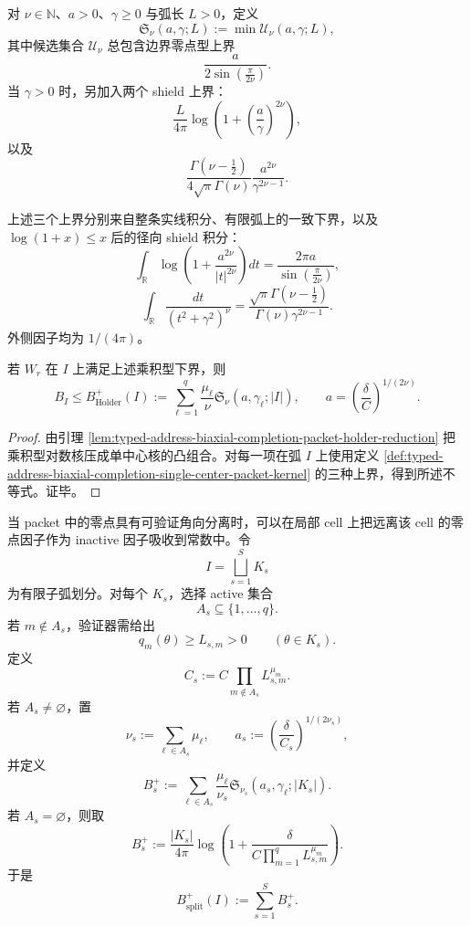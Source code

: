 \begin{definition}[单中心积分核]\label{def:typed-address-biaxial-completion-single-center-packet-kernel}
对 \(\nu\in\mathbb{N}\)、\(a>0\)、\(\gamma\ge0\) 与弧长 \(L>0\)，定义
\[
\mathfrak S_\nu(a,\gamma;L)
:=
\min\mathcal U_\nu(a,\gamma;L),
\]
其中候选集合 \(\mathcal U_\nu\) 总包含边界零点型上界
\[
\frac{a}{2\sin\left(\frac{\pi}{2\nu}\right)}.
\]
当 \(\gamma>0\) 时，另加入两个 shield 上界：
\[
\frac{L}{4\pi}
\log\left(1+\left(\frac{a}{\gamma}\right)^{2\nu}\right),
\]
以及
\[
\frac{\Gamma(\nu-\frac12)}
{4\sqrt{\pi}\Gamma(\nu)}
\frac{a^{2\nu}}{\gamma^{2\nu-1}}.
\]
\end{definition}

上述三个上界分别来自整条实线积分、有限弧上的一致下界，以及 \(\log(1+x)\le x\) 后的径向 shield 积分：
\[
\int_{\mathbb R}\log\left(1+\frac{a^{2\nu}}{|t|^{2\nu}}\right)dt
=
\frac{2\pi a}{\sin\left(\frac{\pi}{2\nu}\right)},
\]
\[
\int_{\mathbb R}\frac{dt}{(t^2+\gamma^2)^\nu}
=
\frac{\sqrt{\pi}\Gamma(\nu-\frac12)}
{\Gamma(\nu)\gamma^{2\nu-1}}.
\]
外侧因子均为 \(1/(4\pi)\)。

\begin{proposition}\label{prop:typed-address-biaxial-completion-unsplit-packet-bound}
若 \(W_r\) 在 \(I\) 上满足上述乘积型下界，则
\[
B_I
\le
B_{\mathrm{Holder}}^+(I)
:=
\sum_{\ell=1}^q
\frac{\mu_\ell}{\nu}
\mathfrak S_\nu(a,\gamma_\ell;|I|),
\qquad
a=\left(\frac{\delta}{C}\right)^{1/(2\nu)}.
\]
\end{proposition}
\begin{proof}
由引理 \ref{lem:typed-address-biaxial-completion-packet-holder-reduction} 把乘积型对数核压成单中心核的凸组合。对每一项在弧 \(I\) 上使用定义 \ref{def:typed-address-biaxial-completion-single-center-packet-kernel} 的三种上界，得到所述不等式。证毕。
\end{proof}

当 packet 中的零点具有可验证角向分离时，可以在局部 cell 上把远离该 cell 的零点因子作为 inactive 因子吸收到常数中。令
\[
I=\bigsqcup_{s=1}^S K_s
\]
为有限子弧划分。对每个 \(K_s\)，选择 active 集合
\[
A_s\subseteq\{1,\ldots,q\}.
\]
若 \(m\notin A_s\)，验证器需给出
\[
q_m(\theta)\ge L_{s,m}>0
\qquad(\theta\in K_s).
\]
定义
\[
C_s:=
C\prod_{m\notin A_s}L_{s,m}^{\mu_m}.
\]
若 \(A_s\ne\varnothing\)，置
\[
\nu_s:=\sum_{\ell\in A_s}\mu_\ell,
\qquad
a_s:=\left(\frac{\delta}{C_s}\right)^{1/(2\nu_s)},
\]
并定义
\[
B_s^+
:=
\sum_{\ell\in A_s}
\frac{\mu_\ell}{\nu_s}
\mathfrak S_{\nu_s}(a_s,\gamma_\ell;|K_s|).
\]
若 \(A_s=\varnothing\)，则取
\[
B_s^+
:=
\frac{|K_s|}{4\pi}
\log\left(
1+
\frac{\delta}{
C\prod_{m=1}^qL_{s,m}^{\mu_m}
}
\right).
\]
于是
\[
B_{\mathrm{split}}^+(I)
:=
\sum_{s=1}^SB_s^+.
\]

